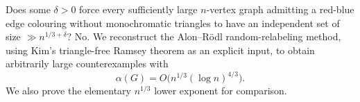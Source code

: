 Does some \(\delta>0\) force every sufficiently large \(n\)-vertex graph admitting a red-blue edge colouring without monochromatic triangles to have an independent set of size \(\gg n^{1/3+\delta}\)?
No. We reconstruct the Alon--R\"odl random-relabeling method, using Kim's triangle-free Ramsey theorem as an explicit input, to obtain arbitrarily large counterexamples with
\[
\alpha(G)=O\bigl(n^{1/3}(\log n)^{4/3}\bigr). \tag{1}
\]
We also prove the elementary \(n^{1/3}\) lower exponent for comparison.
